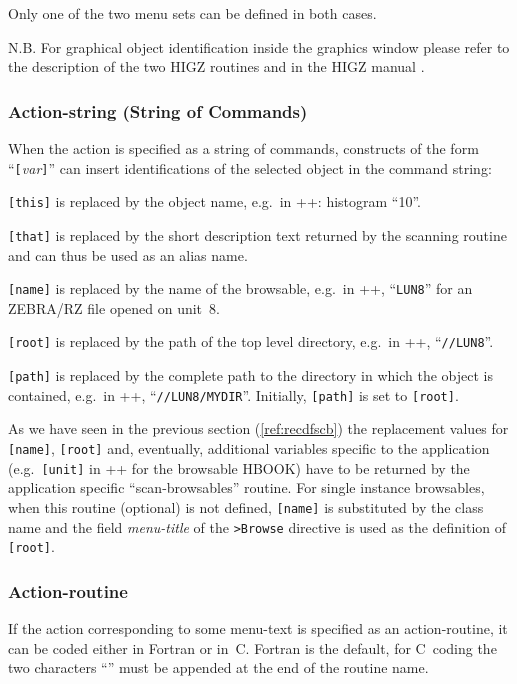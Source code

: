 Only one of the two menu sets can be defined in both cases.

N.B. For graphical object identification inside the graphics window 
please refer to the description of the two HIGZ routines \IGPID{} and
\IGOBJ{} in the HIGZ manual \cite{bib-HIGZ}.

\subsubsection{Action-string (String of Commands)}

When the action is specified as a string of commands,
constructs of the form ``{\tt [}{\em var}{\tt ]}'' can insert
identifications of the selected object in the command string:
\begin{UL}
\item
{\tt [this]} is replaced by the object name, e.g.\ in \PAW++{}: histogram ``10''.
\item
{\tt [that]} is replaced by the short description text returned by the
scanning routine and can thus be used as an alias name.
\item
{\tt [name]} is replaced by the name of the browsable,
e.g.\ in \PAW++{}, ``{\tt LUN8}'' for an ZEBRA/RZ file opened on unit~8.
\item
{\tt [root]} is replaced by the path of the top level directory,
e.g.\ in \PAW++{}, ``{\tt //LUN8}''.
\item
{\tt [path]} is replaced by the complete path to the directory in which the
object is contained, e.g.\ in \PAW++{}, ``{\tt //LUN8/MYDIR}''.
Initially, {\tt [path]} is set to {\tt [root]}.
\end{UL}

As we have seen in the previous section (\ref{ref:recdfscb}) the replacement
values for {\tt [name]}, {\tt [root]} and, eventually, additional 
variables specific to the application (e.g.\ {\tt [unit]} in \PAW++{} for
the browsable HBOOK) have to be returned by the application specific
``scan-browsables'' routine. For single instance
browsables, when this routine (optional) is not defined, {\tt [name]} is 
substituted by the class name and the field {\em menu-title} of the 
{\tt >Browse} directive is used as the definition of {\tt [root]}.


\subsubsection{Action-routine}

If the action corresponding to some menu-text is specified as an 
action-routine, it can be coded either in Fortran or in~C. 
Fortran is the default, for C~coding the 
two characters ``'' must be appended at the end of the routine name. 

